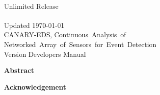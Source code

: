 \documentclass[letterpaper,10pt,twoside]{book}
\begin{document}
\begin{titlepage}

\begin{center}
{\large \CanarySANDDev}\\
{\large Unlimited Release}\\
{\large \CanarySANDDate}\\
{\large Updated \today}\\

\vspace*{1.5cm}
{\LARGE CANARY-EDS, Continuous~Analysis~of~ Networked~Array~of~Sensors~for~Event~Detection}\\
\vspace*{1cm}
{\LARGE Version \CanaryVersion\space Developers Manual}\\
\vspace*{1cm}

\CanaryAuthorFormatted
\vfill
\SandiaFundingStatement
\pagebreak

{\Large \bf Abstract}
\end{center}

\CanaryAbstractShared
\CanaryAbstractDev

\end{titlepage}

\clearpage
\begin{center}
{\Large \bf Acknowledgement}
\end{center}
\CanaryAcknowledge

\cleardoublepage
\tableofcontents
\cleardoublepage

%   


\end{document}
